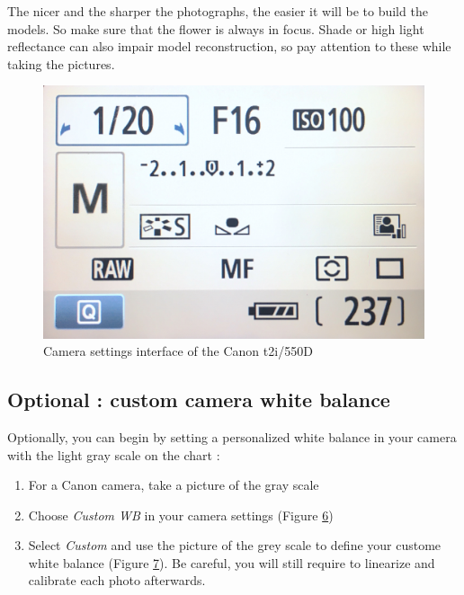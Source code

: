 \documentclass[
]{book}
\theoremstyle{definition}
\theoremstyle{definition}
\theoremstyle{definition}
\theoremstyle{definition}
\theoremstyle{remark}
\begin{document}
The nicer and the sharper the photographs, the easier it will be to
build the models. So make sure that the flower is always in focus. Shade
or high light reflectance can also impair model reconstruction, so pay
attention to these while taking the pictures.

\begin{figure}
\hypertarget{fig:my_label}{%
\centering
\includegraphics{Figures/camera_settings.JPG}
\caption{Camera settings interface of the Canon
t2i/550D}\label{fig:my_label}
}
\end{figure}

\hypertarget{optional-custom-camera-white-balance}{%
\subsection{Optional : custom camera white balance}\label{optional-custom-camera-white-balance}}

Optionally, you can begin by setting a personalized white balance in
your camera with the light gray scale on the chart :

\begin{enumerate}
\def\labelenumi{\arabic{enumi}.}
\item
  For a Canon camera, take a picture of the gray scale
\item
  Choose \emph{Custom WB} in your camera settings (Figure
  \protect\hyperlink{WB_sub1}{6})
\item
  Select \emph{Custom} and use the picture of the grey scale to define your
  custome white balance (Figure \protect\hyperlink{WB_sub2}{7}). Be careful, you will still require to
  linearize and calibrate each photo afterwards.
\end{enumerate}
\end{document}
